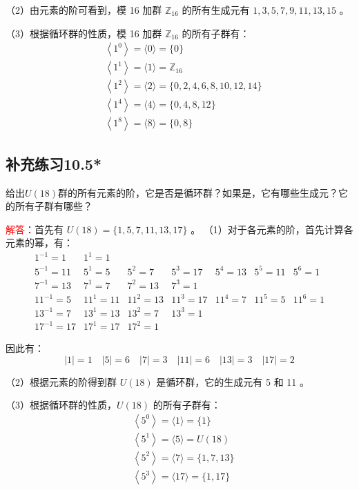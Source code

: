 \documentclass[UTF8, heading=true]{ctexart}
\begin{document}
（2）由元素的阶可看到，模 16 加群 $\mathbb{Z}_{16}$ 的所有生成元有 $1,3,5,7,9,11,13,15$ 。

（3）根据循环群的性质，模 16 加群 $\mathbb{Z}_{16}$ 的所有子群有：
$$
\begin{aligned}
& \left\langle 1^0\right\rangle=\langle 0\rangle=\{0\} \\
& \left\langle 1^1\right\rangle=\langle 1\rangle=\mathbb{Z}_{16} \\
& \left\langle 1^2\right\rangle=\langle 2\rangle=\{0,2,4,6,8,10,12,14\} \\
& \left\langle 1^4\right\rangle=\langle 4\rangle=\{0,4,8,12\} \\
& \left\langle 1^8\right\rangle=\langle 8\rangle=\{0,8\}
\end{aligned}
$$

\subsection{补充练习10.5*}

给出$U(18)$群的所有元素的阶，它是否是循环群？如果是，它有哪些生成元？它的所有子群有哪些？

\textcolor{red}{解答}：首先有 $U(18)=\{1,5,7,11,13,17\}$ 。
（1）对于各元素的阶，首先计算各元素的幂，有：
$$
\begin{array}{lllllll}
1^{-1}=1 & 1^1=1 & & & & & \\
5^{-1}=11 & 5^1=5 & 5^2=7 & 5^3=17 & 5^4=13 & 5^5=11 & 5^6=1 \\
7^{-1}=13 & 7^1=7 & 7^2=13 & 7^3=1 & & & \\
11^{-1}=5 & 11^1=11 & 11^2=13 & 11^3=17 & 11^4=7 & 11^5=5 & 11^6=1 \\
13^{-1}=7 & 13^1=13 & 13^2=7 & 13^3=1 & & & \\
17^{-1}=17 & 17^1=17 & 17^2=1 & & & &
\end{array}
$$


因此有：
$$
|1|=1 \quad|5|=6 \quad|7|=3 \quad|11|=6 \quad|13|=3 \quad|17|=2
$$

（2）根据元素的阶得到群 $U(18)$ 是循环群，它的生成元有 5 和 11 。

（3）根据循环群的性质，$U(18)$ 的所有子群有：
$$
\begin{aligned}
& \left\langle 5^0\right\rangle=\langle 1\rangle=\{1\} \\
& \left\langle 5^1\right\rangle=\langle 5\rangle=U(18) \\
& \left\langle 5^2\right\rangle=\langle 7\rangle=\{1,7,13\} \\
& \left\langle 5^3\right\rangle=\langle 17\rangle=\{1,17\}
\end{aligned}
$$
\end{document}
